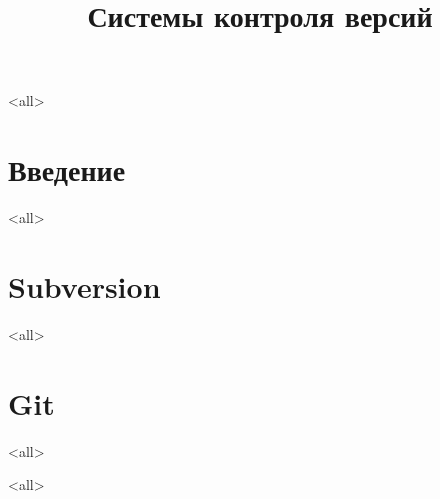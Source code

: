 

\title[VCS]{Системы контроля версий}

\mode<all>{}




\begin{frame}
	\frametitle{}
	\titlepage
	\vspace{-0.5cm}
	\begin{center}
	\end{center}
\end{frame}

\begin{frame}
	\tableofcontents
\end{frame}




\section{Введение}
\mode<all>{}

\section[SVN]{Subversion}
\mode<all>{}

\section{Git}
\mode<all>{}

\mode<all>

